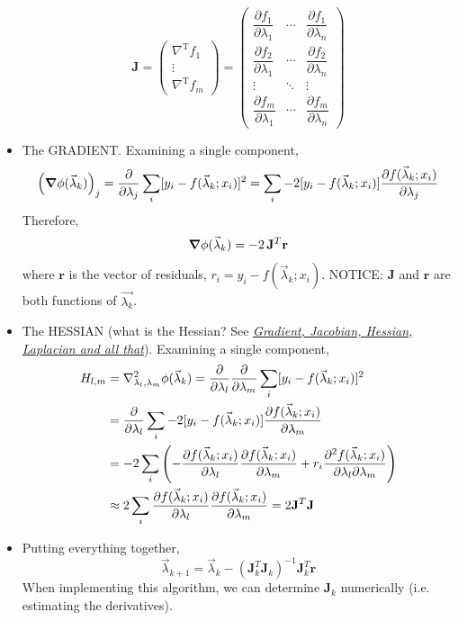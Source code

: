 \documentclass[12pt]{article}
\numberwithin{equation}{section}
\begin{document}
\begin{itemize}
\begin{equation}
		 \mathbf {J} ={\begin{pmatrix}\nabla ^{\mathrm {T} }f_{1}\\\vdots \\\nabla ^{\mathrm {T} }f_{m}\end{pmatrix}}={\begin{pmatrix}{\dfrac {\partial f_{1}}{\partial \lambda_{1}}}&\cdots &{\dfrac {\partial f_{1}}{\partial \lambda_{n}}}\\   \dfrac {\partial f_{2}}{\partial \lambda_{1}}  & \cdots & \dfrac {\partial f_{2}}{\partial \lambda_{n}} \\\vdots &\ddots &\vdots \\{\dfrac {\partial f_{m}}{\partial \lambda_{1}}}&\cdots &{\dfrac {\partial f_{m}}{\partial \lambda_{n}}}\end{pmatrix}}
\end{equation}

\item The GRADIENT. Examining a single component,
\begin{equation}
		\left(\grad{\phi(\vec{\lambda}_k)}\right)_j = \pdv{}{\lambda_j}\sum_i [y_i - f(\vec{\lambda}_k;x_i)]^2 = \sum_i -2[y_i - f(\vec{\lambda}_k;x_i)]\pdv{f(\vec{\lambda}_k; x_i)}{\lambda_j} 
\end{equation}
Therefore,
\begin{equation}
		\grad{\phi(\vec{\lambda}_k)} = -2\,\mathbf{J}^T \mathbf{r}
\end{equation}
where $ \mathbf{r}$ is the vector of residuals, $ r_i =  y_i - f(\vec{\lambda}_k;x_i)$. NOTICE: $ \mathbf{J} $ and $ \mathbf{r} $ are both functions of $ \vec{\lambda_k} $.
\item The HESSIAN (what is the Hessian? See \href{https://najeebkhan.github.io/blog/VecCal.html}{\textit{Gradient, Jacobian, Hessian, Laplacian and all that}}). Examining a single component,
\begin{align*}
		H_{l,m} &= \laplacian_{\lambda_l,\lambda_m} {\phi(\vec{\lambda}_k)} = \pdv{\lambda_l}\pdv{\lambda_m}\sum_i [y_i - f(\vec{\lambda}_k;x_i)]^2 \\
		&=  \pdv{\lambda_l} \sum_i -2[y_i - f(\vec{\lambda}_k;x_i)]\pdv{f(\vec{\lambda}_k; x_i)}{\lambda_m} \\
		&= -2\sum_i \left(-\pdv{f(\vec{\lambda}_k; x_i)}{\lambda_l}\pdv{f(\vec{\lambda}_k; x_i)}{\lambda_m} + r_i\pdv{f(\vec{\lambda}_k; x_i)}{\lambda_l}{\lambda_m} \right)\\
		& \approx  2\sum_i \pdv{f(\vec{\lambda}_k; x_i)}{\lambda_l}\pdv{f(\vec{\lambda}_k; x_i)}{\lambda_m} = 2\mathbf{J}^T \mathbf{J}
\end{align*}
\item Putting everything together,
\begin{equation}
			\vec{\lambda}_{k+1} = 	\vec{\lambda}_{k} - (\mathbf{J}_k^T \mathbf{J}_k)^{-1}\mathbf{J}_k^T\mathbf{r}
\end{equation}
When implementing this algorithm, we can determine $ \mathbf{J}_k $ numerically (i.e. estimating the derivatives). 


\end{itemize}
\end{document}
